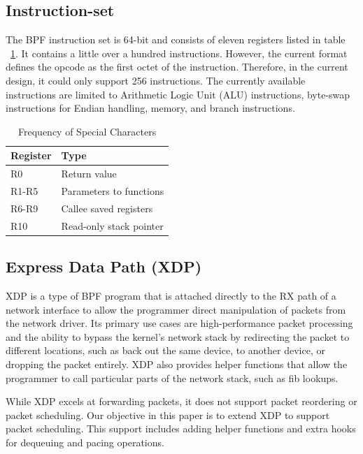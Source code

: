 \documentclass[sigconf, nonacm]{acmart}
\begin{document}
\subsection{Instruction-set}


The BPF instruction set is 64-bit and consists of eleven registers listed in
table ~\ref{table:BPF_registers}. It contains a little over a hundred
instructions. However, the current format defines the opcode as the first octet
of the instruction. Therefore, in the current design, it could only support 256
instructions. The currently available instructions are limited to Arithmetic
Logic Unit (ALU) instructions, byte-swap instructions for Endian handling,
memory, and branch instructions.

\begin{table}
  \caption{Frequency of Special Characters}
  \label{table:BPF_registers}
  \begin{tabular}{ll}
    \toprule
    Register & Type                    \\
    \midrule
    R0       & Return value            \\
    R1-R5    & Parameters to functions \\
    R6-R9    & Callee saved registers  \\
    R10      & Read-only stack pointer \\
    \bottomrule
\end{tabular}
\end{table}


\subsection{Express Data Path (XDP)}

XDP\cite{hoiland2018express} is a type of BPF program that is attached directly to the RX path of a network interface to allow the programmer direct manipulation of packets from the network driver. Its primary use cases are high-performance packet processing and the ability to bypass the kernel's network stack by redirecting the packet to different locations, such as back out the same device, to another device, or dropping the packet entirely. XDP also provides helper functions that allow the programmer to call particular parts of the network stack, such as fib lookups.

While XDP excels at forwarding packets, it does not support packet reordering or packet scheduling. Our objective in this paper is to extend XDP to support packet scheduling. This support includes adding helper functions and extra hooks for dequeuing and pacing operations.
\end{document}
